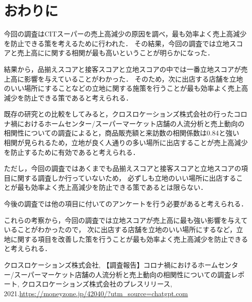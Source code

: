 \documentclass[uplatex]{jsarticle}
\begin{document}
\section{おわりに}


今回の調査はCITスーパーの売上高減少の原因を調べ，最も効率よく売上高減少を防止できる策を考えるために行われた．
その結果，今回の調査では立地スコアと売上高にに関する相関が最も高いということが明らかになった．

結果から，品揃えスコアと接客スコアと立地スコアの中では一番立地スコアが売上高に影響を与えていることがわかった．
そのため，次に出店する店舗を立地のいい場所にすることなどの立地に関する施策を行うことが最も効率よく売上高減少を防止できる策であると考えられる．

既存の研究との比較をしてみると，クロスロケーションズ株式会社の行ったコロナ禍におけるホームセンター/スーパーマーケット店舗の人流分析と売上動向の相関性についての調査によると，商品販売額と来訪数の相関係数は0.84と強い
相関が見られる\cite{crosslocations2021}ため，立地が良く人通りの多い場所に出店することが売上高減少を防止するために有効であると考えられる．

ただし，今回の調査ではあくまでも品揃えスコアと接客スコアと立地スコアの項目に関する調査しか行っていないため，
必ずしも立地のいい場所に出店することが最も効率よく売上高減少を防止できる策であるとは限らない．

今後の調査では他の項目に付いてのアンケートを行う必要があると考えられる．

これらの考察から，今回の調査では立地スコアが売上高に最も強い影響を与えていることがわかったので，
次に出店する店舗を立地のいい場所にするなど，立地に関する項目を改善した策を行うことが最も効率よく売上高減少を防止できると考えられる．


\begin{thebibliography}{9}
 クロスロケーションズ株式会社, 【調査報告】コロナ禍におけるホームセンター/スーパーマーケット店舗の人流分析と売上動向の相関性についての調査レポート, クロスロケーションズ株式会社のプレスリリース, 2021.\url{https://moneyzone.jp/42040/?utm_source=chatgpt.com}
\end{thebibliography}
\end{document}
